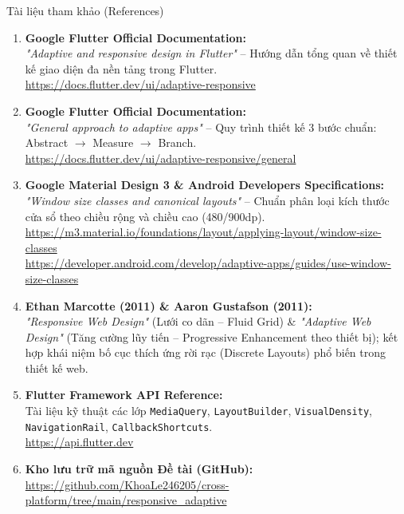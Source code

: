 \documentclass[aspectratio=169, 10pt]{beamer}
\begin{document}
\begin{frame}{Tài liệu tham khảo (References)}
  \vspace{-0.5cm}
  \begin{enumerate}\setlength{\itemsep}{0pt}
    \footnotesize
    \item \textbf{Google Flutter Official Documentation:}\\
    \textit{"Adaptive and responsive design in Flutter"} -- Hướng dẫn tổng quan về thiết kế giao diện đa nền tảng trong Flutter.\\
    \url{https://docs.flutter.dev/ui/adaptive-responsive}

    \item \textbf{Google Flutter Official Documentation:}\\
    \textit{"General approach to adaptive apps"} -- Quy trình thiết kế 3 bước chuẩn: Abstract $\rightarrow$ Measure $\rightarrow$ Branch.\\
    \url{https://docs.flutter.dev/ui/adaptive-responsive/general}

    \item \textbf{Google Material Design 3 \& Android Developers Specifications:}\\
    \textit{"Window size classes and canonical layouts"} -- Chuẩn phân loại kích thước cửa sổ theo chiều rộng và chiều cao (480/900dp).\\
    \url{https://m3.material.io/foundations/layout/applying-layout/window-size-classes}\\
    \url{https://developer.android.com/develop/adaptive-apps/guides/use-window-size-classes}

    \item \textbf{Ethan Marcotte (2011) \& Aaron Gustafson (2011):}\\
    \textit{"Responsive Web Design"} (Lưới co dãn -- Fluid Grid) \& \textit{"Adaptive Web Design"} (Tăng cường lũy tiến -- Progressive Enhancement theo thiết bị); kết hợp khái niệm bố cục thích ứng rời rạc (Discrete Layouts) phổ biến trong thiết kế web.

    \item \textbf{Flutter Framework API Reference:}\\
    Tài liệu kỹ thuật các lớp \texttt{MediaQuery}, \texttt{LayoutBuilder}, \texttt{VisualDensity}, \texttt{NavigationRail}, \texttt{CallbackShortcuts}.\\
    \url{https://api.flutter.dev}

    \item \textbf{Kho lưu trữ mã nguồn Đề tài (GitHub):}\\
    \url{https://github.com/KhoaLe246205/cross-platform/tree/main/responsive_adaptive}
  \end{enumerate}
\end{frame}
\end{document}
